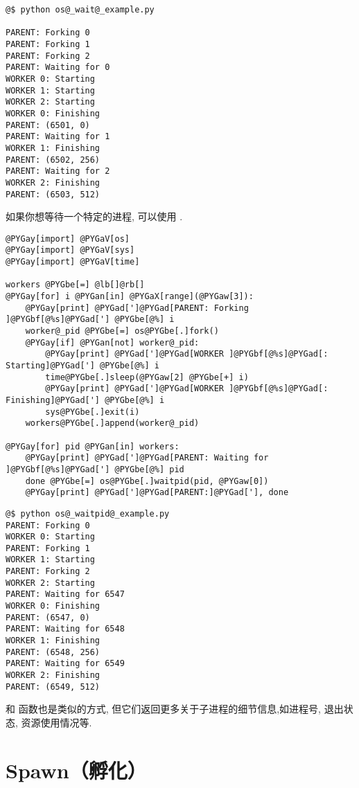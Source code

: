 \documentclass[a4paper,10pt,english]{manual}
\begin{document}
\begin{Verbatim}[commandchars=@\[\]]
@$ python os@_wait@_example.py

PARENT: Forking 0
PARENT: Forking 1
PARENT: Forking 2
PARENT: Waiting for 0
WORKER 0: Starting
WORKER 1: Starting
WORKER 2: Starting
WORKER 0: Finishing
PARENT: (6501, 0)
PARENT: Waiting for 1
WORKER 1: Finishing
PARENT: (6502, 256)
PARENT: Waiting for 2
WORKER 2: Finishing
PARENT: (6503, 512)
\end{Verbatim}

如果你想等待一个特定的进程, 可以使用  .

\begin{Verbatim}[commandchars=@\[\]]
@PYGay[import] @PYGaV[os]
@PYGay[import] @PYGaV[sys]
@PYGay[import] @PYGaV[time]

workers @PYGbe[=] @lb[]@rb[]
@PYGay[for] i @PYGan[in] @PYGaX[range](@PYGaw[3]):
    @PYGay[print] @PYGad[']@PYGad[PARENT: Forking ]@PYGbf[@%s]@PYGad['] @PYGbe[@%] i
    worker@_pid @PYGbe[=] os@PYGbe[.]fork()
    @PYGay[if] @PYGan[not] worker@_pid:
        @PYGay[print] @PYGad[']@PYGad[WORKER ]@PYGbf[@%s]@PYGad[: Starting]@PYGad['] @PYGbe[@%] i
        time@PYGbe[.]sleep(@PYGaw[2] @PYGbe[+] i)
        @PYGay[print] @PYGad[']@PYGad[WORKER ]@PYGbf[@%s]@PYGad[: Finishing]@PYGad['] @PYGbe[@%] i
        sys@PYGbe[.]exit(i)
    workers@PYGbe[.]append(worker@_pid)

@PYGay[for] pid @PYGan[in] workers:
    @PYGay[print] @PYGad[']@PYGad[PARENT: Waiting for ]@PYGbf[@%s]@PYGad['] @PYGbe[@%] pid
    done @PYGbe[=] os@PYGbe[.]waitpid(pid, @PYGaw[0])
    @PYGay[print] @PYGad[']@PYGad[PARENT:]@PYGad['], done
\end{Verbatim}

\begin{Verbatim}[commandchars=@\[\]]
@$ python os@_waitpid@_example.py
PARENT: Forking 0
WORKER 0: Starting
PARENT: Forking 1
WORKER 1: Starting
PARENT: Forking 2
WORKER 2: Starting
PARENT: Waiting for 6547
WORKER 0: Finishing
PARENT: (6547, 0)
PARENT: Waiting for 6548
WORKER 1: Finishing
PARENT: (6548, 256)
PARENT: Waiting for 6549
WORKER 2: Finishing
PARENT: (6549, 512)
\end{Verbatim}

 和  函数也是类似的方式, 但它们返回更多关于子进程的细节信息,如进程号, 退出状态, 资源使用情况等.


\section{Spawn（孵化）}
\end{document}
